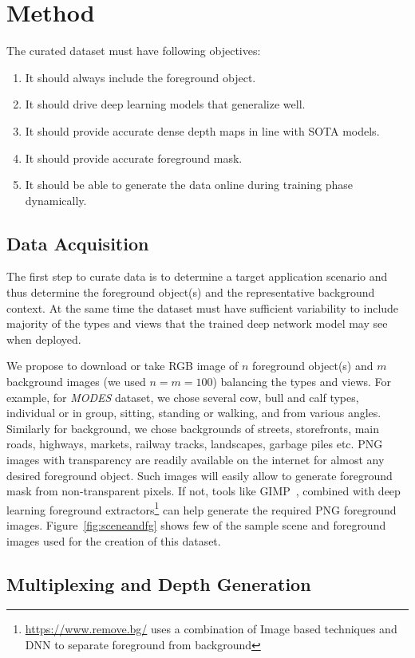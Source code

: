 \documentclass[review]{cvpr}
\begin{document}
\section{Method}
The curated dataset must have following objectives:
\begin{enumerate}
\item It should always include the foreground object. 
\item It should drive deep learning models that generalize well.
\item It should provide accurate dense depth maps in line with SOTA models.
\item It should provide accurate foreground mask.
\item It should be able to generate the data online during training phase dynamically.
\end{enumerate}

\subsection{Data Acquisition}
The first step to curate data is to determine a target application scenario and thus determine the foreground object(s) and the representative background context. At the same time the dataset must have sufficient variability to include majority of the types and views that the trained deep network model may see when deployed.

We propose to download or take RGB image of $n$ foreground object(s) and $m$ background images (we used $n=m=100$) balancing the types and views. For example, for  \textit{MODES} dataset, we chose several cow, bull and calf types, individual  or in group, sitting, standing or walking, and from various angles. Similarly for background, we chose backgrounds of streets,  storefronts, main roads, highways, markets, railway tracks, landscapes, garbage piles etc. PNG images with transparency are readily available on the internet for almost any desired foreground object. Such images will easily allow to generate foreground mask from non-transparent pixels. If not, tools like GIMP~\cite{howat2014greenland}, combined with deep learning foreground extractors\footnote{\url{https://www.remove.bg/} uses a combination of Image based techniques and DNN to separate foreground from background} can help generate the required PNG foreground images. Figure~\ref{fig:sceneandfg} shows few of the sample scene and foreground images used for the creation of this dataset. 

\subsection{Multiplexing and Depth Generation}
\end{document}
